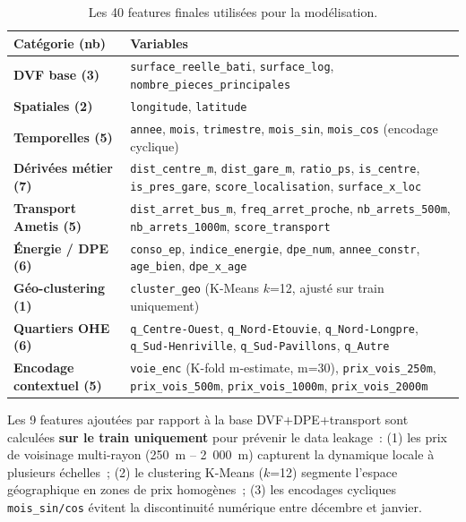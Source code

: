 \documentclass[12pt,a4paper]{article}
\begin{document}
\begin{table}[H]
\centering
\caption{Les 40 features finales utilis\'ees pour la mod\'elisation.}
\label{tab:features}
\small
\begin{tabularx}{\textwidth}{>{\bfseries}p{4.0cm} X}
\toprule
\textbf{Cat\'egorie (nb)} & \textbf{Variables} \\
\midrule
DVF base (3) & \texttt{surface\_reelle\_bati}, \texttt{surface\_log}, \texttt{nombre\_pieces\_principales} \\
\midrule
Spatiales (2) & \texttt{longitude}, \texttt{latitude} \\
\midrule
Temporelles (5) & \texttt{annee}, \texttt{mois}, \texttt{trimestre}, \texttt{mois\_sin}, \texttt{mois\_cos} (encodage cyclique) \\
\midrule
D\'eriv\'ees m\'etier (7) & \texttt{dist\_centre\_m}, \texttt{dist\_gare\_m}, \texttt{ratio\_ps}, \texttt{is\_centre}, \texttt{is\_pres\_gare}, \texttt{score\_localisation}, \texttt{surface\_x\_loc} \\
\midrule
Transport Ametis (5) & \texttt{dist\_arret\_bus\_m}, \texttt{freq\_arret\_proche}, \texttt{nb\_arrets\_500m}, \texttt{nb\_arrets\_1000m}, \texttt{score\_transport} \\
\midrule
\'Energie / DPE (6) & \texttt{conso\_ep}, \texttt{indice\_energie}, \texttt{dpe\_num}, \texttt{annee\_constr}, \texttt{age\_bien}, \texttt{dpe\_x\_age} \\
\midrule
G\'eo-clustering (1) & \texttt{cluster\_geo} (K-Means $k$=12, ajust\'e sur train uniquement) \\
\midrule
Quartiers OHE (6) & \texttt{q\_Centre-Ouest}, \texttt{q\_Nord-Etouvie}, \texttt{q\_Nord-Longpre}, \texttt{q\_Sud-Henriville}, \texttt{q\_Sud-Pavillons}, \texttt{q\_Autre} \\
\midrule
Encodage contextuel (5) & \texttt{voie\_enc} (K-fold m-estimate, m=30), \texttt{prix\_vois\_250m}, \texttt{prix\_vois\_500m}, \texttt{prix\_vois\_1000m}, \texttt{prix\_vois\_2000m} \\
\bottomrule
\end{tabularx}
\end{table}

\begin{descrbox}
Les 9 features ajout\'ees par rapport \`a la base DVF+DPE+transport sont calcul\'ees \textbf{sur le train uniquement} pour pr\'evenir le data leakage~: (1) les prix de voisinage multi-rayon (250~m -- 2~000~m) capturent la dynamique locale \`a plusieurs \'echelles~; (2) le clustering K-Means ($k$=12) segmente l'espace g\'eographique en zones de prix homog\`enes~; (3) les encodages cycliques \texttt{mois\_sin/cos} \'evitent la discontinuit\'e num\'erique entre d\'ecembre et janvier.
\end{descrbox}
\end{document}
